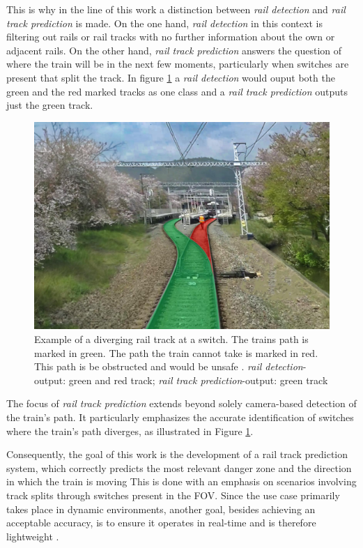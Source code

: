 This is why in the line of this work a distinction between \textit{rail detection} and \textit{rail track prediction} is made.
On the one hand, \textit{rail detection} in this context is filtering out rails or rail tracks with no further information about the own or adjacent rails.
On the other hand, \textit{rail track prediction} answers the question of where the train will be in the next few moments, particularly when switches are present that split the track.
In figure \ref{fig:train-ego-path} a \textit{rail detection} would ouput both the green and the red marked tracks as one class and a \textit{rail track prediction} outputs just the green track.

\vspace{1cm} %

\begin{figure}[H]
    \centering
    \includegraphics[width=0.5\linewidth]{PICs/Introduction/train-ego-path.png}
    \caption{Example of a diverging rail track at a switch. The trains path is marked in green. The path the train cannot take is marked in red. This path is be obstructed and would be unsafe \cite{tepNet2024}. \textit{rail detection}-output: green and red track; \textit{rail track prediction}-output: green track}
    \label{fig:train-ego-path}
\end{figure}

The focus of \textit{rail track prediction} extends beyond solely camera-based detection of the train's path.
It particularly emphasizes the accurate identification of switches where the train's path diverges, as illustrated in Figure \ref{fig:train-ego-path}.

Consequently, the goal of this work is the development of a rail track prediction system, which correctly predicts the most relevant danger zone and the direction in which the train is moving
This is done with an emphasis on scenarios involving track splits through switches present in the \ac{FOV}.
Since the use case primarily takes place in dynamic environments, another goal, besides achieving an acceptable accuracy, is to ensure it operates in real-time and is therefore lightweight \cite{tepNet2024}.

